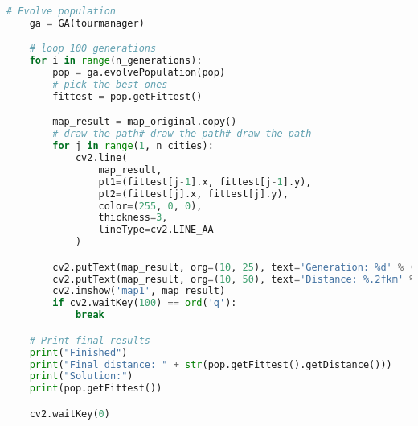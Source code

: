 \documentclass[12pt]{article}
\begin{document}
\begin{lstlisting}[language=Python]
    # Evolve population
    ga = GA(tourmanager)

    # loop 100 generations
    for i in range(n_generations):
        pop = ga.evolvePopulation(pop)
        # pick the best ones
        fittest = pop.getFittest()

        map_result = map_original.copy()
        # draw the path# draw the path# draw the path
        for j in range(1, n_cities):
            cv2.line(
                map_result,
                pt1=(fittest[j-1].x, fittest[j-1].y),
                pt2=(fittest[j].x, fittest[j].y),
                color=(255, 0, 0),
                thickness=3,
                lineType=cv2.LINE_AA
            )

        cv2.putText(map_result, org=(10, 25), text='Generation: %d' % (i+1), fontFace=cv2.FONT_HERSHEY_SIMPLEX, fontScale=0.7, color=0, thickness=1, lineType=cv2.LINE_AA)
        cv2.putText(map_result, org=(10, 50), text='Distance: %.2fkm' % fittest.getDistance(), fontFace=cv2.FONT_HERSHEY_SIMPLEX, fontScale=0.7, color=0, thickness=1, lineType=cv2.LINE_AA)
        cv2.imshow('map1', map_result)
        if cv2.waitKey(100) == ord('q'):
            break

    # Print final results
    print("Finished")
    print("Final distance: " + str(pop.getFittest().getDistance()))
    print("Solution:")
    print(pop.getFittest())

    cv2.waitKey(0)
    \end{lstlisting}
\end{document}
